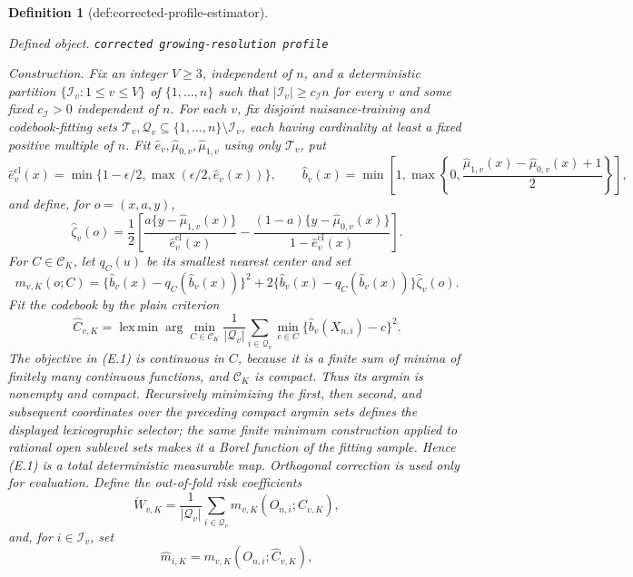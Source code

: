 \documentclass{article}
\newtheorem{definition}{Definition}
\begin{document}
\begin{definition}[def:corrected-profile-estimator]\label{def:corrected-profile-estimator}
\par\smallskip\noindent\emph{Defined object.} \texttt{corrected growing-\allowbreak{}resolution profile}
\par\smallskip\noindent\emph{Construction.} Fix an integer \(V\geq3\), independent of \(n\), and a deterministic partition \(\{\mathcal I_v:1\leq v\leq V\}\) of \(\{1,\ldots,n\}\) such that \(|\mathcal I_v|\geq c_{\mathcal I}n\) for every \(v\) and some fixed \(c_{\mathcal I}>0\) independent of \(n\).  For each \(v\), fix disjoint nuisance-training and codebook-fitting sets \(\mathcal T_v,\mathcal Q_v\subseteq\{1,\ldots,n\}\setminus\mathcal I_v\), each having cardinality at least a fixed positive multiple of \(n\).  Fit \(\widehat e_v,\widehat\mu_{0,v},\widehat\mu_{1,v}\) using only \(\mathcal T_v\), put
\[
 \widehat e_v^{\mathrm{cl}}(x)=\min\{1-\epsilon/2,\max(\epsilon/2,\widehat e_v(x))\},
 \qquad
 \widehat b_v(x)=\min\!\left[1,\max\!\left\{0,
 \frac{\widehat\mu_{1,v}(x)-\widehat\mu_{0,v}(x)+1}{2}\right\}\right],
\]
and define, for \(o=(x,a,y)\),
\[
 \widehat\zeta_v(o)=\frac12\left[
 \frac{a\{y-\widehat\mu_{1,v}(x)\}}{\widehat e_v^{\mathrm{cl}}(x)}
 -\frac{(1-a)\{y-\widehat\mu_{0,v}(x)\}}{1-\widehat e_v^{\mathrm{cl}}(x)}\right].
\]
For \(C\in\mathcal C_K\), let \(q_C(u)\) be its smallest nearest center and set
\[
 m_{v,K}(o;C)=\{\widehat b_v(x)-q_C(\widehat b_v(x))\}^2
 +2\{\widehat b_v(x)-q_C(\widehat b_v(x))\}\widehat\zeta_v(o).
\]
Fit the codebook by the plain criterion
\[
 \widehat C_{v,K}
 =\operatorname*{lex\,min}\arg\min_{C\in\mathcal C_K}
 \frac1{|\mathcal Q_v|}\sum_{i\in\mathcal Q_v}
 \min_{c\in C}\{\widehat b_v(X_{n,i})-c\}^2.                                  \tag{E.1}
\]
The objective in (E.1) is continuous in \(C\), because it is a finite sum of minima of finitely many continuous functions, and \(\mathcal C_K\) is compact.  Thus its argmin is nonempty and compact.  Recursively minimizing the first, then second, and subsequent coordinates over the preceding compact argmin sets defines the displayed lexicographic selector; the same finite minimum construction applied to rational open sublevel sets makes it a Borel function of the fitting sample.  Hence (E.1) is a total deterministic measurable map.  Orthogonal correction is used only for evaluation.  Define the out-of-fold risk coefficients
\[
 \check W_{v,K}=\frac1{|\mathcal Q_v|}\sum_{i\in\mathcal Q_v}
 m_{v,K}(O_{n,i};\widehat C_{v,K}),
\]
and, for \(i\in\mathcal I_v\), set
\[
 \widehat m_{i,K}=m_{v,K}(O_{n,i};\widehat C_{v,K}),
\]
\end{definition}
\end{document}
